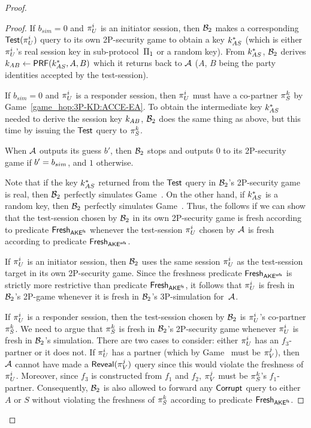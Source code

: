 \begin{proof}
\begin{proof}
If $b_{sim} = 0$ and $\oracle[U][i]$ is an initiator session,
then $\A[B]_2$ makes a corresponding $\Test(\oracle[U][i])$ query to its own 2P-\akefstext security game to obtain a key $\key_{AS}^*$
(which is either $\oracle[U][i]$'s real session key in sub-protocol~$\protocol_1$
or a random key).
From $\key_{AS}^*$,
$\A[B]_2$  derives  $\key_{AB} \gets \mathsf{PRF}(\key_{AS}^*, A, B)$ which it returns back to $\A$
($A$, $B$ being the party identities accepted by the test-session).

If $b_{sim} = 0$ and $\oracle[U][i]$ is a responder session,
then $\oracle[U][i]$ must have a co-partner $\oracle[S][k]$ by Game~\ref{game_hop:3P-KD:ACCE-EA}.
To obtain the intermediate key $\key_{AS}^*$ needed to derive the session key $\key_{AB}$, 
$\A[B]_2$ does the same thing as above,
but this time by issuing the $\Test$ query to $\oracle[S][k]$.



When $\A$ outputs its guess $b'$,
then $\A[B]_2$ stops and outputs $0$ to its 2P-\akefstext security game if $b' = \bsim$,
and $1$ otherwise.
\medskip

Note that if the key $\key_{AS}^*$ returned from the $\Test$ query in $\A[B]_2$'s 2P-\akefstext security game is real, 
then $\A[B]_2$ perfectly simulates Game~\prevgame{}.
On the other hand,
if $\key_{AS}^*$ is a random key,
then $\A[B]_2$ perfectly simulates Game~\game{}.
Thus, the  follows if we can show that the test-session chosen by $\A[B]_2$ in its own 2P-\akefstext security game is fresh according to predicate $\fresh_{\akefs}$ whenever the test-session $\oracle[U][i]$ chosen by $\A$ is fresh according to predicate $\fresh_{\akewfs}$.

If $\oracle[U][i]$ is an initiator session,
then $\A[B]_2$  uses the same session $\oracle[U][i]$ as the test-session target in its own 2P-\akefstext security game.
Since the freshness predicate $\fresh_{\akewfs}$ is strictly more restrictive than predicate $\fresh_{\akefs}$,
it follows that $\oracle[U][i]$ is fresh in $\A[B]_2$'s 2P-\akefstext game whenever it is fresh in $\A[B]_2$'s 3P-\akewfstext simulation for~$\A$.

If $\oracle[U][i]$ is a responder session,
then the test-session chosen by $\A[B]_2$ is $\oracle[U][i]$'s co-partner $\oracle[S][k]$.
We need to argue that $\oracle[S][k]$ is fresh in $\A[B]_2$'s 2P-\akefstext security game whenever $\oracle[U][i]$ is \akewfstext fresh in $\A[B]_2$'s simulation.
There are two cases to consider: either $\oracle[U][i]$ has an $f_3$-partner or it does not.
If $\oracle[U][i]$ has a partner
(which by Game~\prevgame{} must be $\oracle[V][j]$), 
then $\A$ cannot have made a $\Reveal(\oracle[V][j])$ query since this would violate the \akewfstext freshness of $\oracle[U][i]$.
Moreover,
since $f_3$ is constructed from $f_1$ and $f_2$,
$\oracle[V][j]$ must be $\oracle[S][k]$'s $f_1$-partner.
Consequently,
$\A[B]_2$ is also allowed to forward any $\Corrupt$ query to either $A$ or $S$ without violating the freshness of $\oracle[S][k]$ according to predicate $\fresh_{\akefs}$.


\end{proof}
\end{proof}

